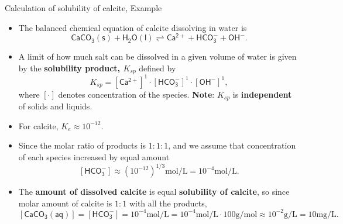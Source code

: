 %
%
\begin{frame}{Calculation of solubility of calcite, Example}
%
\begin{itemize}
\item The balanced chemical equation of calcite dissolving in water is
\[
\mathsf{CaCO_3(s) + H_2O(l) \rightleftharpoons Ca^{2+} + HCO^{-}_3 + OH^{-} }.
\]
\vskip -5pt
%
\item A limit of how much salt can be dissolved in a given volume of water is given by the \alert{\bf solubility product, $K_{sp}$} defined by 
%
\[
K_{sp} = [\mathsf{Ca^{2+}}]^1 \cdot [\mathsf{HCO^-_3}]^1 \cdot [\mathsf{OH^{-}}]^1,
\] 
where $[\cdot]$ denotes concentration of the species. {\bf Note}: $K_{sp}$ is \textbf{independent} of solids and liquids.

\item For calcite, $K_e \approx 10^{-12}$. 
%
%
%
\item Since the molar ratio of products is $1 : 1 : 1$, 
and we assume that concentration of each species increased by equal amount 
%
\[
[\mathsf{HCO^{-}_3}] \approx (10^{-12})^{1/3} \mbox{mol/L} = 10^{-4} \mbox{mol/L}.
\] 
%
\item The \textbf{amount of dissolved calcite} is equal \textbf{solubility of calcite}, so since molar amount of calcite is $1 : 1$ with all the products,
\[
[\mathsf{CaCO_3(aq)}] = [\mathsf{HCO^{-}_3}] = 10^{-4} \mbox{mol/L} 
= 10^{-4}  \mbox{mol/L} \cdot 100 \mbox{g/mol} 
\approx 10^{-2} \mbox{g/L}
= 10 \mbox{mg/L}.
\]
\end{itemize}
%
\end{frame}
%
%
